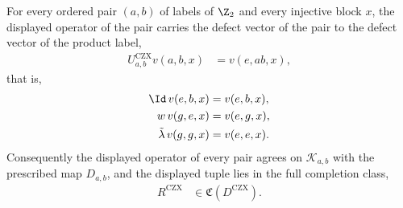 \begin{lemma}
    \label{thm:mpug_czx_tuple_completion}
    \leanok
    For every ordered pair $(a,b)$ of labels of $\Z_2$ and every injective
    block $x$, the displayed operator of the pair carries the defect vector of
    the pair to the defect vector of the product label,
    \begin{align}
        U^{\mathrm{CZX}}_{a,b}v(a,b,x) & =v(e,ab,x),
        \label{eq:mpug_czx_tuple_fusion}
    \end{align}
    that is,
    \begin{align}
        \Id\,v(e,b,x)           & =v(e,b,x),
        \label{eq:mpug_czx_tuple_fusion_trivial}  \\
        w\,v(g,e,x)             & =v(e,g,x),
        \label{eq:mpug_czx_tuple_fusion_movement} \\
        \tilde\lambda\,v(g,g,x) & =v(e,e,x).
        \label{eq:mpug_czx_tuple_fusion_modified}
    \end{align}
    Consequently the displayed operator of every pair agrees on
    $\mathcal K_{a,b}$ with the prescribed map $D_{a,b}$, and the displayed
    tuple lies in the full completion class,
    \begin{align}
        R^{\mathrm{CZX}} & \in\mathfrak C(D^{\mathrm{CZX}}).
        \label{eq:mpug_czx_tuple_completion}
    \end{align}
\end{lemma}

